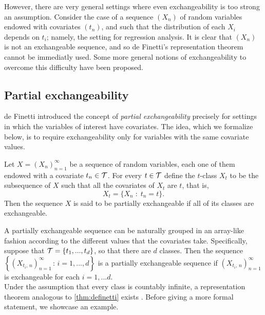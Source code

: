 However, there are very general settings where even exchangeability is too strong an assumption. Consider the case of a sequence $(X_n)$ of random variables endowed with covariates $(t_n)$, and such that the distribution of each $X_i$ depends on $t_i$; namely, the setting for regression analysis. It is clear that $(X_n)$ is not an exchangeable sequence, and so de Finetti's representation theorem cannot be immediatly used. Some more general notions of exchangeability to overcome this difficulty have been proposed.


\subsection{Partial exchangeability}


de Finetti \cite{deFinetti:1938:partial_exch} introduced the concept of \textit{partial exchangeability} precisely for settings in which the variables of interest have covariates. The idea, which we formalize below, is to require exchangeability only for variables with the same covariate values.

\begin{definition}
	Let $X = (X_n)_{n=1}^{\infty}$ be a sequence of random variables, each one of them endowed with a covariate $t_n \in \mathcal{T}$. For every $t \in \mathcal{T}$ define the $t$-class $X_t$ to be the subsequence of $X$ such that all the covariates of $X_t$ are $t$, that is,
	\begin{equation*}
		X_t = \{ X_n \; : \; t_n = t \}.
	\end{equation*}
	Then the sequence $X$ is said to be partially exchangeable if all of its classes are exchangeable.
\end{definition}

A partially exchangeable sequence can be naturally grouped in an array-like fashion according to the different values that the covariates take. Specifically, suppose that $\mathcal{T} = \{t_1, ..., t_d \}$, so that there are $d$ classes. Then the sequence $\left\{ (X_{t_i, \, n})_{n=1}^{\infty} \, : \, i=1, ..., d \right\}$ is a partially exchangeable sequence if $(X_{t_i, \, n})_{n=1}^{\infty}$ is exchangeable for each $i=1, ...d$. \\

Under the assumption that every class is countably infinite, a representation theorem analogous to \ref{thm:definetti} exists \cite{CampbellEtAl:2019:LocalExch}. Before giving a more formal statement, we showcase an example.


